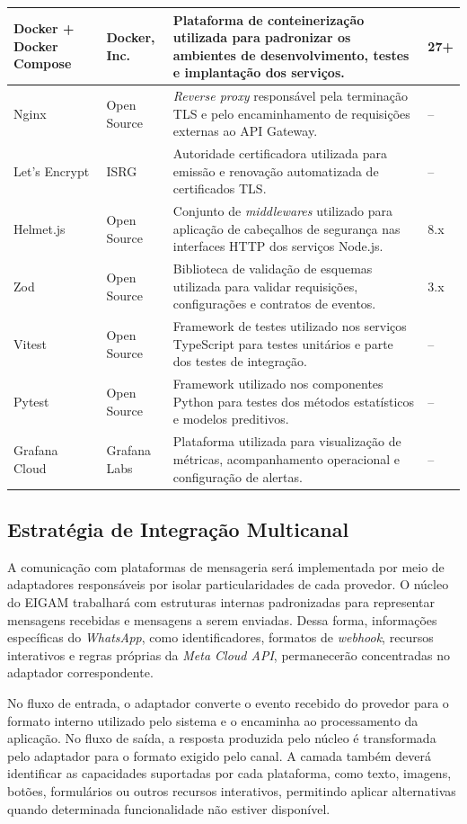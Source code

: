 {\begin{longtable}{|L{3.2cm}|L{2.8cm}|L{6.7cm}|L{1.5cm}|}
Docker + Docker Compose & Docker, Inc. & Plataforma de conteinerização utilizada para padronizar os ambientes de desenvolvimento, testes e implantação dos serviços. & 27+ \\ \hline
Nginx & Open Source & \textit{Reverse proxy} responsável pela terminação TLS e pelo encaminhamento de requisições externas ao API Gateway. & -- \\ \hline
Let's Encrypt & ISRG & Autoridade certificadora utilizada para emissão e renovação automatizada de certificados TLS. & -- \\ \hline
Helmet.js & Open Source & Conjunto de \textit{middlewares} utilizado para aplicação de cabeçalhos de segurança nas interfaces HTTP dos serviços Node.js. & 8.x \\ \hline
Zod & Open Source & Biblioteca de validação de esquemas utilizada para validar requisições, configurações e contratos de eventos. & 3.x \\ \hline
Vitest & Open Source & Framework de testes utilizado nos serviços TypeScript para testes unitários e parte dos testes de integração. & -- \\ \hline
Pytest & Open Source & Framework utilizado nos componentes Python para testes dos métodos estatísticos e modelos preditivos. & -- \\ \hline
Grafana Cloud & Grafana Labs & Plataforma utilizada para visualização de métricas, acompanhamento operacional e configuração de alertas. & -- \\ \hline

\end{longtable}
}

\subsection{Estratégia de Integração Multicanal}

A comunicação com plataformas de mensageria será implementada por meio de adaptadores responsáveis por isolar particularidades de cada provedor. O núcleo do EIGAM trabalhará com estruturas internas padronizadas para representar mensagens recebidas e mensagens a serem enviadas. Dessa forma, informações específicas do \textit{WhatsApp}, como identificadores, formatos de \textit{webhook}, recursos interativos e regras próprias da \textit{Meta Cloud API}, permanecerão concentradas no adaptador correspondente.

No fluxo de entrada, o adaptador converte o evento recebido do provedor para o formato interno utilizado pelo sistema e o encaminha ao processamento da aplicação. No fluxo de saída, a resposta produzida pelo núcleo é transformada pelo adaptador para o formato exigido pelo canal. A camada também deverá identificar as capacidades suportadas por cada plataforma, como texto, imagens, botões, formulários ou outros recursos interativos, permitindo aplicar alternativas quando determinada funcionalidade não estiver disponível.

